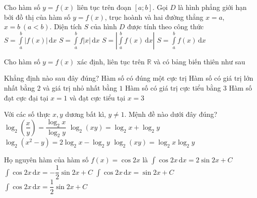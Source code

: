 \begin{ex}%
Cho hàm số $ y = f(x) $ liên tục trên đoạn $ [a;b] $. Gọi $ D $ là hình phẳng giới hạn bởi đồ thị của hàm số $  y = f(x) $, trục hoành và hai đường thẳng $ x=a $, $ x = b\ (a < b ) $. Diện tích $ S $ của hình $ D $ được tính theo công thức	
	\choice
	{\True $ S = \displaystyle \int \limits^b_a \Big | f(x) \Big | \mathrm{\, d}x $}
	{$ S = \displaystyle \int \limits^b_a f|x| \mathrm{\, d}x $}
	{$ S = \left | \displaystyle \int \limits^b_a f(x)   \mathrm{\, d}x \right | $}
	{$ S = \displaystyle \int \limits^b_a f(x) \mathrm{\, d}x $}
\end{ex}
\begin{ex}%
Cho hàm số $ y = f(x) $ xác định, liên tục trên $ \mathbb{R} $ và có bảng biến thiên như sau 
\begin{center}
\end{center}
Khẳng định nào sau đây đúng?		
	\choice
	{Hàm số có đúng một cực trị}
	{Hàm số có giá trị lớn nhất bằng $ 2 $ và giá trị nhỏ nhất bằng $ 1 $}
	{Hàm số có giá trị cực tiểu bằng $ 3 $}
	{\True Hàm số đạt cực đại tại $ x = 1 $ và đạt cực tiểu tại $ x = 3 $}
\end{ex}
\begin{ex}%
Với các số thực $ x, y $ dương bất kì, $  y \neq 1 $. Mệnh đề nào dưới đây đúng?	
	\choice
	{$ \log_2 \left ( \dfrac{x}{y} \right ) = \dfrac{\log_2 x}{\log_2 y} $}
	{\True $ \log_2 (xy) = \log_2 x + \log_2 y $}
	{$ \log_2 (x^2 - y) = 2 \log_2 x - \log_2 y $}
	{$ \log_2(xy) = \log_2 x \log_2 y $}
\end{ex}
\begin{ex}%
Họ nguyên hàm của hàm số $ f(x) = \cos 2x $ là	
	\choice
	{$ \displaystyle \int \cos 2x \mathrm{\, d}x = 2\sin 2x + C $}
	{$ \displaystyle \int \cos 2x \mathrm{\, d}x =  - \dfrac{1}{2} \sin 2x + C$}
	{$ \displaystyle \int \cos 2x \mathrm{\, d}x = \sin 2x + C $}
	{\True $ \displaystyle \int \cos 2x \mathrm{\, d}x = \dfrac{1}{2} \sin 2x + C $}
\end{ex}
